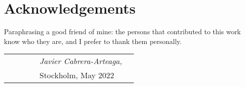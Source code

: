 \section*{Acknowledgements}

Paraphrasing a good friend of mine: the persons that contributed to this work know who they are, and I prefer to thank them personally.



\begin{table}[hb]
\begin{tabular}{lp{6.67cm}llll}
& & & & \textit{Javier Cabrera-Arteaga,} \\
& & & & Stockholm, May 2022
\end{tabular}
\end{table}




